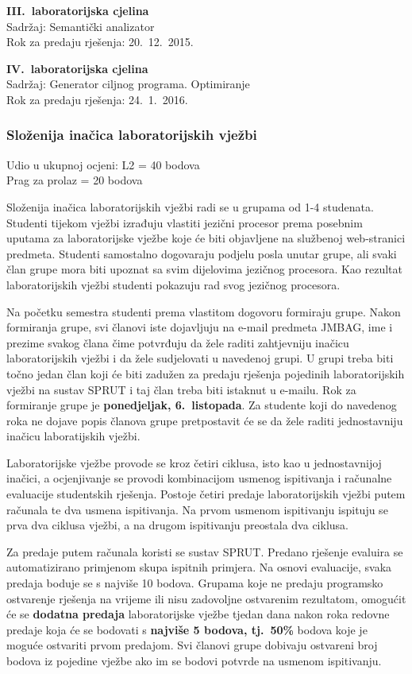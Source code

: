 \documentclass[times, 12pt, utf8]{book}
\begin{document}
\textbf{III.~laboratorijska cjelina } \\
Sadržaj: Semantički analizator \\
Rok za predaju rješenja: 20.~12.~2015.

\textbf{IV.~laboratorijska cjelina} \\
Sadržaj: Generator ciljnog programa. Optimiranje \\
Rok za predaju rješenja: 24.~1.~2016.


\subsubsection{Složenija inačica laboratorijskih vježbi}
Udio u ukupnoj ocjeni: L2 = 40 bodova \\
Prag za prolaz = 20 bodova

Složenija inačica laboratorijskih vježbi radi se u grupama od 1-4 studenata.
Studenti tijekom vježbi izrađuju vlastiti jezični procesor prema posebnim uputama za laboratorijske vježbe koje će biti objavljene na službenoj web-stranici predmeta.
Studenti samostalno dogovaraju podjelu posla unutar grupe, ali svaki član grupe mora biti upoznat sa svim dijelovima jezičnog procesora.
Kao rezultat laboratorijskih vježbi studenti pokazuju rad svog jezičnog procesora.

Na početku semestra studenti prema vlastitom dogovoru formiraju grupe.
Nakon formiranja grupe, svi članovi iste dojavljuju na e-mail predmeta JMBAG, ime i prezime svakog člana čime potvrđuju da žele raditi zahtjevniju inačicu laboratorijskih vježbi i da žele sudjelovati u navedenoj grupi.
U grupi treba biti točno jedan član koji će biti zadužen za predaju rješenja pojedinih laboratorijskih vježbi na sustav SPRUT i taj član treba biti istaknut u e-mailu.
Rok za formiranje grupe je \textbf{ponedjeljak, 6.~listopada}.
Za studente koji do navedenog roka ne dojave popis članova grupe pretpostavit će se da žele raditi jednostavniju inačicu laboratijskih vježbi.

Laboratorijske vježbe provode se kroz četiri ciklusa, isto kao u jednostavnijoj inačici, a ocjenjivanje se provodi kombinacijom usmenog ispitivanja i računalne evaluacije studentskih rješenja.
Postoje četiri predaje laboratorijskih vježbi putem računala te dva usmena ispitivanja.
Na prvom usmenom ispitivanju ispituju se prva dva ciklusa vježbi, a na drugom ispitivanju preostala dva ciklusa.

Za predaje putem računala koristi se sustav SPRUT.
Predano rješenje evaluira se automatizirano primjenom skupa ispitnih primjera.
Na osnovi evaluacije, svaka predaja boduje se s najviše 10 bodova.
Grupama koje ne predaju programsko ostvarenje rješenja na vrijeme ili nisu zadovoljne ostvarenim rezultatom, omogućit će se \textbf{dodatna predaja} laboratorijske vježbe tjedan dana nakon roka redovne predaje koja će se bodovati s \textbf{najviše 5 bodova, tj.~50\%} bodova koje je moguće ostvariti prvom predajom.
Svi članovi grupe dobivaju ostvareni broj bodova iz pojedine vježbe ako im se bodovi potvrde na usmenom ispitivanju.
\end{document}
